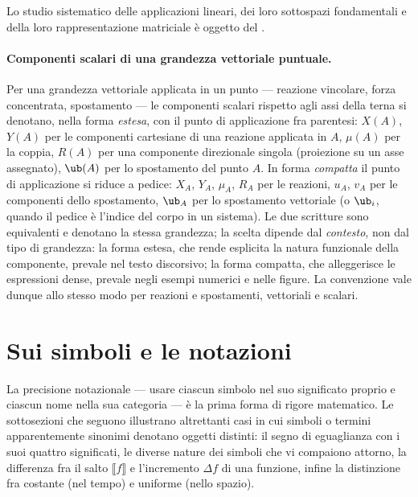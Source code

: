 Lo studio sistematico delle applicazioni lineari, dei loro 
sottospazi fondamentali e della loro rappresentazione matriciale 
è oggetto del .


\paragraph{Componenti scalari di una grandezza vettoriale puntuale.}
Per una grandezza vettoriale applicata in un punto --- reazione
vincolare, forza concentrata, spostamento --- le componenti scalari
rispetto agli assi della terna si denotano, nella forma \emph{estesa},
con il punto di applicazione fra parentesi: $X(A)$, $Y(A)$ per le
componenti cartesiane di una reazione applicata in $A$, $\mu(A)$ per la
coppia, $R(A)$ per una componente direzionale singola (proiezione su un
asse assegnato), $\ub(A)$ per lo spostamento del punto $A$. In forma
\emph{compatta} il punto di applicazione si riduce a pedice: $X_A$,
$Y_A$, $\mu_A$, $R_A$ per le reazioni, $u_A$, $v_A$ per le componenti
dello spostamento, $\ub_A$ per lo spostamento vettoriale (o $\ub_i$,
quando il pedice è l'indice del corpo in un sistema). Le due scritture
sono equivalenti e denotano la stessa grandezza; la scelta dipende dal
\emph{contesto}, non dal tipo di grandezza: la forma estesa, che rende
esplicita la natura funzionale della componente, prevale nel testo
discorsivo; la forma compatta, che alleggerisce le espressioni dense,
prevale negli esempi numerici e nelle figure. La convenzione vale
dunque allo stesso modo per reazioni e spostamenti, vettoriali e
scalari.



\section{Sui simboli e le notazioni}\label{sec:simboli}

La precisione notazionale --- usare ciascun simbolo nel suo 
significato proprio e ciascun nome nella sua categoria --- è la 
prima forma di rigore matematico. Le sottosezioni che seguono 
illustrano altrettanti casi in cui simboli o termini apparentemente 
sinonimi denotano oggetti distinti: il segno di eguaglianza con i 
suoi quattro significati, le diverse nature dei simboli che vi 
compaiono attorno, la differenza fra il salto $\llbracket f 
\rrbracket$ e l'incremento $\Delta f$ di una funzione, infine la 
distinzione fra costante (nel tempo) e uniforme (nello spazio).


